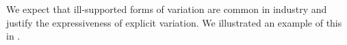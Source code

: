 We expect that ill-supported forms of variation are common in industry and
justify the expressiveness of explicit variation. We illustrated an example of this
in .
%



